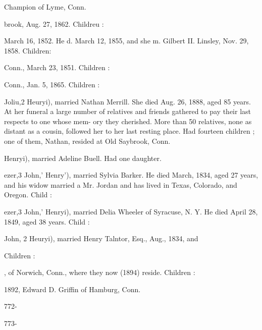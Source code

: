 \documentclass[oneside]{book}
\begin{document}
Champion of Lyme, Conn. 


brook, Aug. 27, 1862. Childreu : 








March 16, 1852. He d. March 12, 1855, and she m. Gilbert II. 
Linsley, Nov. 29, 1858. Children: 














Conn., March 23, 1851. Children : 




Conn., Jan. 5, 1865. Children : 








Joliu,2 Heuryi), married Nathan Merrill. She died Aug. 26, 
1888, aged 85 years. At her funeral a large number of relatives 
and friends gathered to pay their last respects to one whose mem- 
ory they cherished. More than 50 relatives, none as distant as 
a cousin, followed her to her last resting place. Had fourteen 
children ; one of them, Nathan, resided at Old Saybrook, Conn. 

Henryi), married Adeline Buell. Had one daughter. 


ezer,3 John,' Henry'), married Sylvia Barker. He died March, 
1834, aged 27 years, and his widow married a Mr. Jordan and 
has lived in Texas, Colorado, and Oregon. Child : 


ezer,3 John,' Henryi), married Delia Wheeler of Syracuse, N. Y. 
He died April 28, 1849, aged 38 years. Child : 


John, 2 Heuryi), married Henry Talntor, Esq., Aug., 1834, and 

Children : 






, of Norwich, Conn., where they now (1894) reside. Children : 


1892, Edward D. Griffin of Hamburg, Conn. 







772- 




773- 
\end{document}
